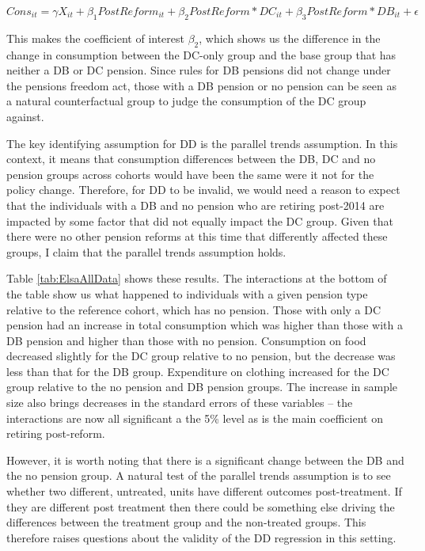 \documentclass[12pt]{article}
\begin{document}
\begin{equation*}
    Cons_{it} =  \gamma X_{it} + \beta_{1} PostReform_{it} + \beta_{2} PostReform*DC_{it} + \beta_{3} PostReform*DB_{it}  + \epsilon
\end{equation*}


This makes the coefficient of interest $\beta_{2}$, which shows us the
difference in the change in consumption between the DC-only group and the base
group that has neither a DB or DC pension. Since rules for DB pensions did not
change under the pensions freedom act, those with a DB pension or no pension can
be seen as a natural counterfactual group to judge the consumption of the DC
group against.

The key identifying assumption for DD is the parallel trends assumption. In this
context, it means that consumption differences between the DB, DC and no pension
groups across cohorts would have been the same were it not for the policy change.
Therefore, for DD to be invalid, we would need a reason to expect that the
individuals with a DB and no pension who are retiring post-2014 are impacted by
some factor that did not equally impact the DC group. Given that there were no
other pension reforms at this time that differently affected these groups, I
claim that the parallel trends assumption holds.

Table \ref{tab:ElsaAllData} shows these results. The interactions at the bottom
of the table show us what happened to individuals with a given pension type
relative to the reference cohort, which has no pension. Those with only a DC
pension had an increase in total consumption which was higher than those with a
DB pension and higher than those with no pension. Consumption on food decreased
slightly for the DC group relative to no pension, but the decrease was less than
that for the DB group. Expenditure on clothing increased for the DC group
relative to the no pension and DB pension groups. The increase in sample size
also brings decreases in the standard errors of these variables -- the
interactions are now all significant a the 5\% level as is the main coefficient
on retiring post-reform.

However, it is worth noting that there is a significant change between the DB
and the no pension group. A natural test of the parallel trends assumption is to
see whether two different, untreated, units have different outcomes
post-treatment. If they are different post treatment then there could be
something else driving the differences between the treatment group and the
non-treated groups. This therefore raises questions about the validity of the DD
regression in this setting.
\end{document}
